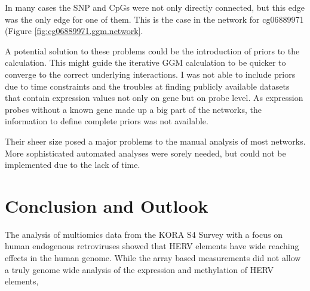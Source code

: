 \documentclass[a4paper,12pt,twoside,openright]{article}
\let\oldsection\section
\def\section{\cleardoublepage\oldsection}
\begin{document}
In many cases the SNP and CpGs were not only directly connected, but this edge was the only edge for one of them. This is the case in the network for cg06889971 (Figure \ref{fig:cg06889971.ggm.network}.

A potential solution to these problems could be the introduction of priors to the calculation. This might guide the iterative GGM calculation to be quicker to converge to the correct underlying interactions. I was not able to include priors due to time constraints and the troubles at finding publicly available datasets that contain expression values not only on gene but on probe level. As expression probes without a known gene made up a big part of the networks, the information to define complete priors was not available. 

Their sheer size posed a major problems to the manual analysis of most networks. More sophisticated automated analyses were sorely needed, but could not be implemented due to the lack of time. 


\newpage
\section{Conclusion and Outlook}
\label{Conclusion and Outlook}
The analysis of multiomics data from the KORA S4 Survey with a focus on human endogenous retroviruses showed that HERV elements have wide reaching effects in the human genome. While the array based measurements did not allow a truly genome wide analysis of the expression and methylation of HERV elements, 

\newpage
\listoffigures
\listoftables

{}

\end{document}
